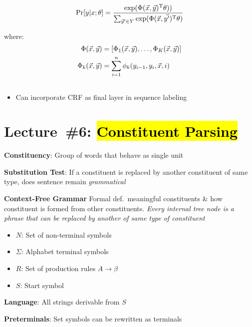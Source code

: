\documentclass[9pt]{extarticle}
\renewcommand{\green}[1]{{\color{ForestGreen} #1}}
\newcommand{\greenbf}[1]{\textbf{\green{#1}}}
\begin{document}
\begin{multicols}{3}
  \begin{equation*}
    \Pr[y \vert x; \theta] = \frac{\exp(\Phi(\vec{x},\vec{y})^{\text{T}}\theta))}{\sum_{\vec{y}' \in Y} \exp(\Phi(\vec{x}, \vec{y'})^{\text{T}}\theta)}
  \end{equation*}

  where:
  \begin{align*}
      \Phi(\vec{x},\vec{y}) &= \lbrack\Phi_{1}(\vec{x},\vec{y}),\ldots,\Phi_{K}(\vec{x},\vec{y})\rbrack \\
      \Phi_{k}(\vec{x},\vec{y}) &= \sum_{i=1}^{n} \phi_{k}(y_{i-1},y_{i},\vec{x},i)
  \end{align*}
  \subsection*{}

  \begin{itemize}
    \item Can incorporate CRF as final layer in sequence labeling
  \end{itemize}

  \section*{Lecture~\#6: \hl{Constituent Parsing}}

  \greenbf{Constituency}: Group of words that behave as single unit

  \greenbf{Substitution Test}: If a constituent is replaced by another constituent of same type, does sentence remain \textit{grammatical}

  \greenbf{Context-Free Grammar} Formal def.\ meaningful constituents \& how constituent is formed from other constituents.  \textit{Every internal tree node is a phrase that can be replaced by another of same type of constituent}
  \begin{itemize}
    \item $N$: Set of non-terminal symbols
    \item $\Sigma$: Alphabet terminal symbols
    \item $R$: Set of production rules $A \rightarrow \beta$
    \item $S$: Start symbol
  \end{itemize}

  \textbf{Language}: All strings derivable from $S$

  \textbf{Preterminals}: Set symbols can be rewritten as terminals


\end{multicols}
\end{document}
